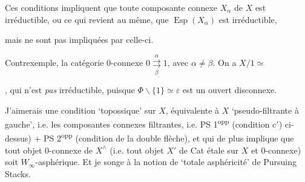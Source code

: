 \documentclass[11pt]{article}
\newcommand{\msp}[1]{\marginpar{\footnotesize [#1]}}
\begin{document}
\noindent Ces conditions impliquent que toute composante connexe $X_{\alpha}$ de $X$ est irréductible, ou ce qui revient au même, que $\operatorname{Esp}(X_{\alpha})$ est irréductible,

\msp{page 15}

\noindent mais ne sont pas impliquées par celle-ci.

Contrexemple, la catégorie 0-connexe $0 \underset{\beta}{\overset{\alpha}{\rightrightarrows}} 1$, avec $\alpha \neq \beta$. On a $X/1 \simeq$
, qui n'est \textit{pas} irréductible, puisque $\Phi \backslash \{1\} \simeq \varepsilon$ est un ouvert disconnexe.

J'aimerais une condition `topossique' sur $X$, équivalente à $X$ `pseudo-filtrante à gauche', i.e. les composantes connexes filtrantes, i.e. PS 1\textsuperscript{opp} (condition c$'$) ci-dessus) + PS 2\textsuperscript{opp} (condition de la double flèche), et qui de plus implique que tout objet 0-connexe de $X^{\wedge}$ (i.e. tout objet $X'$ de Cat étale sur $X$ et 0-connexe) soit $W_{\infty}$-asphérique. Et je songe à la notion de `totale asphéricité' de Pursuing Stacks.
\end{document}
